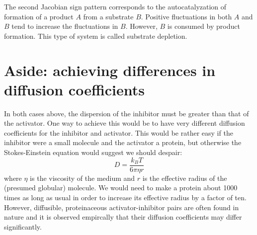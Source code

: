 \documentclass{article}
\begin{document}
The second Jacobian sign pattern corresponds to the autocatalyzation of formation of a product $A$ from a substrate $B$. Positive fluctuations in both $A$ and $B$ tend to increase the fluctuations in $B$. However, $B$ is consumed by product formation. This type of system is called substrate depletion.\\

\section*{Aside: achieving differences in diffusion coefficients}

In both cases above, the dispersion of the inhibitor must be greater than that of the activator. One way to achieve this would be to have very different diffusion coefficients for the inhibitor and activator. This would be rather easy if the inhibitor were a small molecule and the activator a protein, but otherwise the Stokes-Einstein equation would suggest we should despair:
\[ D = \frac{k_B T}{6 \pi \eta r} \]
where $\eta$ is the viscosity of the medium and $r$ is the effective radius of the (presumed globular) molecule. We would need to make a protein about 1000 times as long as usual in order to increase its effective radius by a factor of ten. However, diffusible, proteinaceous activator-inhibitor pairs are often found in nature and it is observed empircally that their diffusion coefficients may differ significantly.\\
\end{document}
